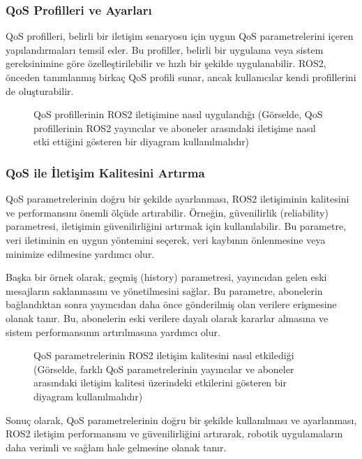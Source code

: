 \subsubsection{QoS Profilleri ve Ayarları}
QoS profilleri, belirli bir iletişim senaryosu için uygun QoS parametrelerini içeren yapılandırmaları temsil eder. Bu profiller, belirli bir uygulama veya sistem gereksinimine göre özelleştirilebilir ve hızlı bir şekilde uygulanabilir. ROS2, önceden tanımlanmış birkaç QoS profili sunar, ancak kullanıcılar kendi profillerini de oluşturabilir.

\begin{figure}[h]
\centering
\caption{QoS profillerinin ROS2 iletişimine nasıl uygulandığı (Görselde, QoS profillerinin ROS2 yayıncılar ve aboneler arasındaki iletişime nasıl etki ettiğini gösteren bir diyagram kullanılmalıdır)}
\end{figure}
\subsubsection{QoS ile İletişim Kalitesini Artırma}
QoS parametrelerinin doğru bir şekilde ayarlanması, ROS2 iletişiminin kalitesini ve performansını önemli ölçüde artırabilir. Örneğin, güvenilirlik (reliability) parametresi, iletişimin güvenilirliğini artırmak için kullanılabilir. Bu parametre, veri iletiminin en uygun yöntemini seçerek, veri kaybının önlenmesine veya minimize edilmesine yardımcı olur.

Başka bir örnek olarak, geçmiş (history) parametresi, yayıncıdan gelen eski mesajların saklanmasını ve yönetilmesini sağlar. Bu parametre, abonelerin bağlandıktan sonra yayıncıdan daha önce gönderilmiş olan verilere erişmesine olanak tanır. Bu, abonelerin eski verilere dayalı olarak kararlar almasına ve sistem performansının artırılmasına yardımcı olur.

\begin{figure}[h]
\centering
\caption{QoS parametrelerinin ROS2 iletişim kalitesini nasıl etkilediği (Görselde, farklı QoS parametrelerinin yayıncılar ve aboneler arasındaki iletişim kalitesi üzerindeki etkilerini gösteren bir diyagram kullanılmalıdır)}
\end{figure}

Sonuç olarak, QoS parametrelerinin doğru bir şekilde kullanılması ve ayarlanması, ROS2 iletişim performansını ve güvenilirliğini artırarak, robotik uygulamaların daha verimli ve sağlam hale gelmesine olanak tanır.

